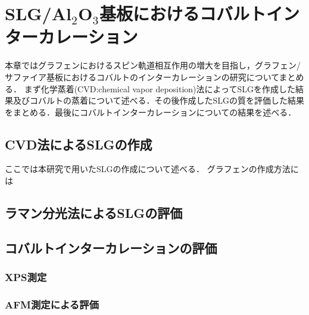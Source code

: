 \chapter{SLG/Al$_{2}$O$_{3}$基板におけるコバルトインターカレーション}

本章ではグラフェンにおけるスピン軌道相互作用の増大を目指し，グラフェン/サファイア基板におけるコバルトのインターカレーションの研究についてまとめる．
まず化学蒸着(CVD:chemical vapor deposition)法によってSLGを作成した結果及びコバルトの蒸着について述べる．その後作成したSLGの質を評価した結果をまとめる．最後にコバルトインターカレーションについての結果を述べる．

\section{CVD法によるSLGの作成}
ここでは本研究で用いたSLGの作成について述べる．
グラフェンの作成方法には



\section{ラマン分光法によるSLGの評価}

\section{コバルトインターカレーションの評価}

\subsection{XPS測定}

\subsection{AFM測定による評価}

